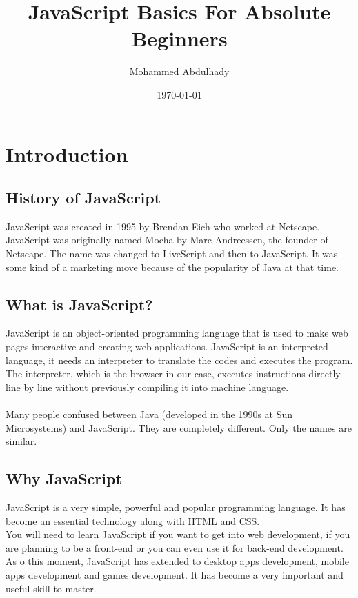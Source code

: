 \documentclass {book}
\begin{document}
	\title{JavaScript Basics For Absolute Beginners}
	\author{Mohammed Abdulhady}
	\date{\today}
	\maketitle
	\tableofcontents
	
	
	
	\chapter{Introduction}
	
	\section{History of JavaScript}
	JavaScript was created in 1995 by Brendan Eich who worked at Netscape. JavaScript was originally named Mocha by Marc Andreessen, the founder of Netscape. The name was changed to LiveScript and then to JavaScript. It was some kind of a marketing move because of the popularity of Java at that time.
	
	\section{What is JavaScript?}
	JavaScript is an object-oriented programming language that is used to make web pages interactive and creating web applications. JavaScript is an interpreted language, it needs an interpreter to translate the codes and executes the program. The interpreter, which is the browser in our case, executes instructions directly line by line without previously compiling it into machine language.\\\\
	Many people confused between Java (developed in the 1990s at Sun Microsystems) and JavaScript. They are completely different. Only the names are similar.
	
	\section{Why JavaScript}
	JavaScript is a very simple, powerful and popular programming language. It has become an essential technology along with HTML and CSS.\\
	You will need to learn JavaScript if you want to get into web development, if you are planning to be a front-end or you can even use it for back-end development.\\
	As o this moment, JavaScript has extended to desktop apps development, mobile apps development and games development.
	It has become a very important and useful skill to master.
	
\end{document}
